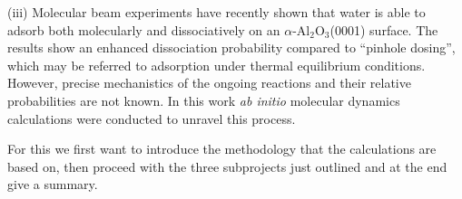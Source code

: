 \documentclass[11pt,DIV=13,BCOR=5mm,a4paper,headinclude]{scrbook}
\begin{document}
(iii) Molecular beam experiments have recently shown that water is able to adsorb both molecularly and dissociatively on an $\alpha$-Al$_{\text{2}}$O$_{\text{3}}$(0001) surface\cite{Wirth2014}.
The results show an enhanced dissociation probability compared to ``pinhole dosing'', which may be referred to adsorption under thermal equilibrium conditions.
However, precise mechanistics of the ongoing reactions  and their relative probabilities are not known.
In this work \textit{ab initio} molecular dynamics calculations were conducted to unravel this process.


For this we first want to introduce the methodology that the calculations are based on, then proceed with the three subprojects just outlined and at the end give a summary.

\end{document}

